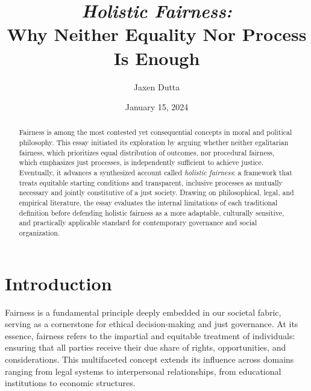 \documentclass[11pt,showkeys]{../../shared/essay}
\begin{document}
\title{\textit{Holistic Fairness:}\\
Why Neither Equality Nor Process Is Enough}

\author{Jaxen Dutta}

\date{January 15, 2024}

\begin{abstract}
Fairness is among the most contested yet consequential concepts in moral and political philosophy. This essay initiated its exploration by arguing whether neither egalitarian fairness, which prioritizes equal distribution of outcomes, nor procedural fairness, which emphasizes just processes, is independently sufficient to achieve justice. Eventually, it advances a synthesized account called \textit{holistic fairness}: a framework that treats equitable starting conditions and transparent, inclusive processes as mutually necessary and jointly constitutive of a just society. Drawing on philosophical, legal, and empirical literature, the essay evaluates the internal limitations of each traditional definition before defending holistic fairness as a more adaptable, culturally sensitive, and practically applicable standard for contemporary governance and social organization.
\end{abstract}


\maketitle

\section{Introduction}

Fairness is a fundamental principle deeply embedded in our societal fabric, serving as a cornerstone for ethical decision-making and just governance. At its essence, fairness refers to the impartial and equitable treatment of individuals: ensuring that all parties receive their due share of rights, opportunities, and considerations. This multifaceted concept extends its influence across domains ranging from legal systems to interpersonal relationships, from educational institutions to economic structures.
\end{document}
